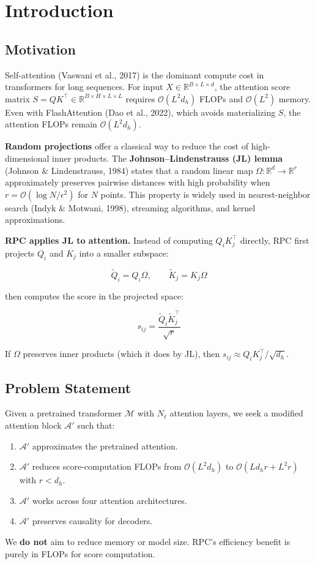 
\section{Introduction}

\subsection{Motivation}

Self-attention (Vaswani et al., 2017) is the dominant compute cost in 
transformers for long sequences. For input $X \in \mathbb{R}^{B \times L \times d}$, 
the attention score matrix $S = Q K^\top \in \mathbb{R}^{B \times H \times L \times L}$ 
requires $\mathcal{O}(L^2 d_h)$ FLOPs and $\mathcal{O}(L^2)$ memory. Even 
with FlashAttention (Dao et al., 2022), which avoids materializing $S$, the 
attention FLOPs remain $\mathcal{O}(L^2 d_h)$.

\textbf{Random projections} offer a classical way to reduce the cost of 
high-dimensional inner products. The \textbf{Johnson--Lindenstrauss (JL) lemma} 
(Johnson \& Lindenstrauss, 1984) states that a random linear map 
$\Omega : \mathbb{R}^d \to \mathbb{R}^r$ approximately preserves pairwise 
distances with high probability when $r = \mathcal{O}(\log N / \epsilon^2)$ 
for $N$ points. This property is widely used in nearest-neighbor search 
(Indyk \& Motwani, 1998), streaming algorithms, and kernel approximations.

\textbf{RPC applies JL to attention.} Instead of computing $Q_i K_j^\top$ directly, 
RPC first projects $Q_i$ and $K_j$ into a smaller subspace:

\[
\tilde{Q}_i = Q_i \Omega, \qquad \tilde{K}_j = K_j \Omega
\tag{1.1}
\]

then computes the score in the projected space:

\[
s_{ij} = \frac{\tilde{Q}_i \tilde{K}_j^\top}{\sqrt{r}}
\tag{1.2}
\]

If $\Omega$ preserves inner products (which it does by JL), then 
$s_{ij} \approx Q_i K_j^\top / \sqrt{d_h}$.

\subsection{Problem Statement}

Given a pretrained transformer $\mathcal{M}$ with $N_\ell$ attention layers, 
we seek a modified attention block $\mathcal{A}'$ such that:

\begin{enumerate}
\item $\mathcal{A}'$ approximates the pretrained attention.
\item $\mathcal{A}'$ reduces score-computation FLOPs from $\mathcal{O}(L^2 d_h)$
  to $\mathcal{O}(L d_h r + L^2 r)$ with $r < d_h$.
\item $\mathcal{A}'$ works across four attention architectures.
\item $\mathcal{A}'$ preserves causality for decoders.

\end{enumerate}
We \textbf{do not} aim to reduce memory or model size. RPC's efficiency benefit 
is purely in FLOPs for score computation.

